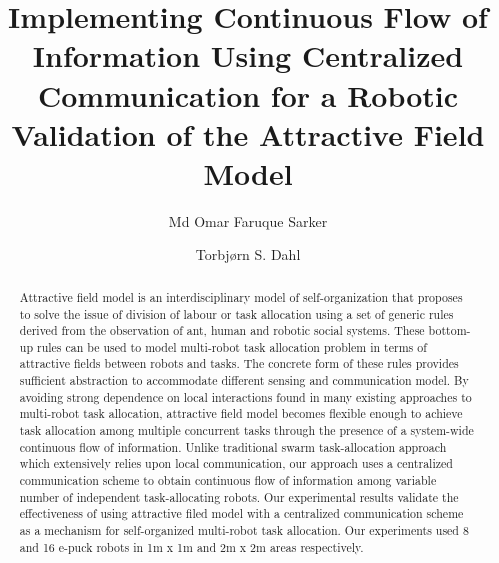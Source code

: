 \documentclass[smallcondensed]{svjour3}
\begin{document}
\title{Implementing Continuous Flow of Information Using Centralized Communication for a Robotic Validation of the Attractive Field Model}
\author{Md Omar Faruque Sarker \and
Torbj{\o}rn S. Dahl %
}
\maketitle
\begin{abstract}
Attractive field model is an interdisciplinary model of self-organization that proposes to solve the issue of division of labour or task allocation using a set of generic rules derived from the observation of ant, human and robotic social systems. These bottom-up rules can be used to model multi-robot task allocation problem in terms of attractive fields between robots and tasks. The concrete form of these rules provides  sufficient abstraction to accommodate different sensing and communication model.  By avoiding strong dependence on local interactions found in many existing approaches to  multi-robot task allocation, attractive field model  becomes flexible enough to achieve task allocation among multiple concurrent tasks through the presence of a system-wide continuous flow of information.  Unlike traditional swarm task-allocation approach which extensively relies upon local communication, our approach uses a centralized communication scheme to obtain continuous flow of information among variable number of  independent task-allocating robots. Our experimental  results validate the effectiveness of  using attractive filed model with a centralized communication scheme as a mechanism for self-organized multi-robot task allocation. Our experiments used 8 and 16 e-puck robots in 1m x 1m and 2m x 2m areas respectively.
\end{abstract}
\end{document}
